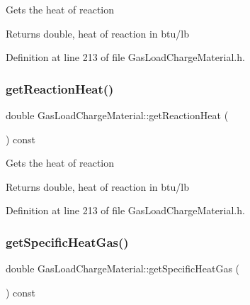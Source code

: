Gets the heat of reaction

\begin{DoxyReturn}{Returns}
double, heat of reaction in btu/lb 
\end{DoxyReturn}


Definition at line 213 of file Gas\+Load\+Charge\+Material.\+h.

\mbox{\label{class_gas_load_charge_material_a605eaf21d1f25f27b53627aeb903c93d}} 
\subsubsection{\texorpdfstring{get\+Reaction\+Heat()}{getReactionHeat()}\hspace{0.1cm}{\footnotesize\ttfamily [3/3]}}
{\footnotesize\ttfamily double Gas\+Load\+Charge\+Material\+::get\+Reaction\+Heat (\begin{DoxyParamCaption}{ }\end{DoxyParamCaption}) const\hspace{0.3cm}{\ttfamily [inline]}}

Gets the heat of reaction

\begin{DoxyReturn}{Returns}
double, heat of reaction in btu/lb 
\end{DoxyReturn}


Definition at line 213 of file Gas\+Load\+Charge\+Material.\+h.

\mbox{\label{class_gas_load_charge_material_a66e956e7a52b1032a3e8a725f26fa580}} 
\subsubsection{\texorpdfstring{get\+Specific\+Heat\+Gas()}{getSpecificHeatGas()}\hspace{0.1cm}{\footnotesize\ttfamily [1/3]}}
{\footnotesize\ttfamily double Gas\+Load\+Charge\+Material\+::get\+Specific\+Heat\+Gas (\begin{DoxyParamCaption}{ }\end{DoxyParamCaption}) const\hspace{0.3cm}{\ttfamily [inline]}}

